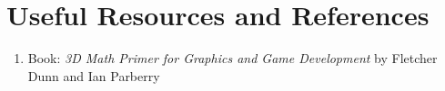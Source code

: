 \documentclass[12pt]{report}
\author{CxRedix}
\begin{document}


\pagebreak


\newpage
\tableofcontents

\newpage


\newpage


\newpage


\newpage


\newpage


\newpage


\newpage


\newpage


\newpage


\newpage


\newpage
\chapter{Useful Resources and References}

\begin{enumerate}
    \item Book: \emph{3D Math Primer for Graphics and Game Development} by Fletcher Dunn and Ian Parberry
\end{enumerate}
\end{document}
